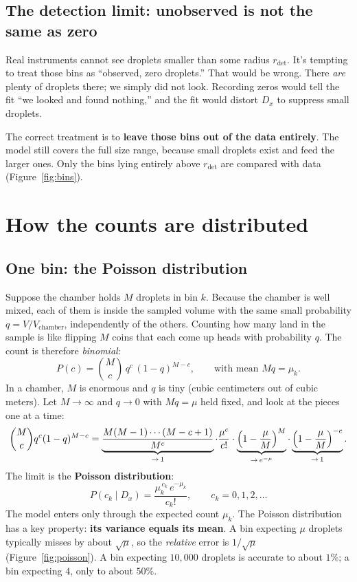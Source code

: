 \documentclass[11pt]{article}
\newcommand{\rdet}{r_{\mathrm{det}}}
\begin{document}
\subsection{The detection limit: unobserved is not the same as zero}
Real instruments cannot see droplets smaller than some radius $\rdet$. It's tempting to treat those bins as ``observed, zero droplets.'' That would be wrong. There \emph{are} plenty of droplets there; we simply did not look. Recording zeros would tell the fit ``we looked and found nothing,'' and the fit would distort $D_x$ to suppress small droplets.

The correct treatment is to \textbf{leave those bins out of the data entirely}. The model still covers the full size range, because small droplets exist and feed the larger ones. Only the bins lying entirely above $\rdet$ are compared with data (Figure~\ref{fig:bins}).

\section{How the counts are distributed}\label{sec:stats}
\subsection{One bin: the Poisson distribution}
Suppose the chamber holds $M$ droplets in bin $k$. Because the chamber is well mixed, each of them is inside the sampled volume with the same small probability $q = V/V_{\mathrm{chamber}}$, independently of the others. Counting how many land in the sample is like flipping $M$ coins that each come up heads with probability $q$. The count is therefore \emph{binomial}:
\[
P(c) = \binom{M}{c}\,q^c\,(1-q)^{M-c},\qquad \text{with mean } Mq = \mu_k .
\]
In a chamber, $M$ is enormous and $q$ is tiny (cubic centimeters out of cubic meters). Let $M\to\infty$ and $q\to0$ with $Mq = \mu$ held fixed, and look at the pieces one at a time:
\[
\binom{M}{c}q^c(1-q)^{M-c}
= \underbrace{\frac{M(M-1)\cdots(M-c+1)}{M^c}}_{\to\,1}\cdot\frac{\mu^c}{c!}\cdot\underbrace{\Bigl(1-\frac{\mu}{M}\Bigr)^{M}}_{\to\,e^{-\mu}}\cdot\underbrace{\Bigl(1-\frac{\mu}{M}\Bigr)^{-c}}_{\to\,1}.
\]
The limit is the \textbf{Poisson distribution}:
\begin{equation}\label{eq:poisson}
P(c_k\mid D_x) = \frac{\mu_k^{\,c_k}\,e^{-\mu_k}}{c_k!},\qquad c_k = 0,1,2,\dots
\end{equation}
The model enters only through the expected count $\mu_k$. The Poisson distribution has a key property: \textbf{its variance equals its mean}. A bin expecting $\mu$ droplets typically misses by about $\sqrt\mu$, so the \emph{relative} error is $1/\sqrt\mu$ (Figure~\ref{fig:poisson}). A bin expecting $10{,}000$ droplets is accurate to about $1\%$; a bin expecting $4$, only to about $50\%$.
\end{document}
